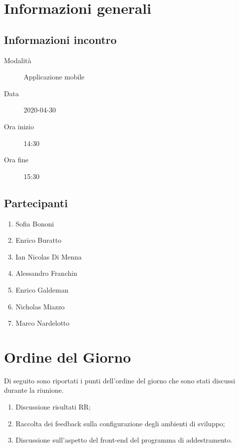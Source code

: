\documentclass{article}
\begin{document}


\section{Informazioni generali}%
\label{sec:informazioni_generali}

\subsection{Informazioni incontro}%
\label{sub:informazioni_incontro}

\begin{description}
  \item[Modalità] Applicazione mobile 
  \item[Data] 2020-04-30
  \item[Ora inizio] 14:30
  \item[Ora fine] 15:30
\end{description}

\subsection{Partecipanti}%
\label{sub:partecipanti}

\begin{enumerate}
  \item Sofia Bononi
  \item Enrico Buratto
  \item Ian Nicolas Di Menna
  \item Alessandro Franchin
  \item Enrico Galdeman
  \item Nicholas Miazzo
  \item Marco Nardelotto
\end{enumerate}

\section{Ordine del Giorno}%
\label{ordine_del_giorno}
Di seguito sono riportati i punti dell'ordine del giorno che sono stati discussi durante la riunione.
\begin{enumerate}
  \item Discussione risultati RR;
  \item Raccolta dei feedback sulla configurazione degli ambienti di sviluppo;
  \item Discussione sull'aspetto del front-end del programma di addestramento.
\end{enumerate}
\end{document}
